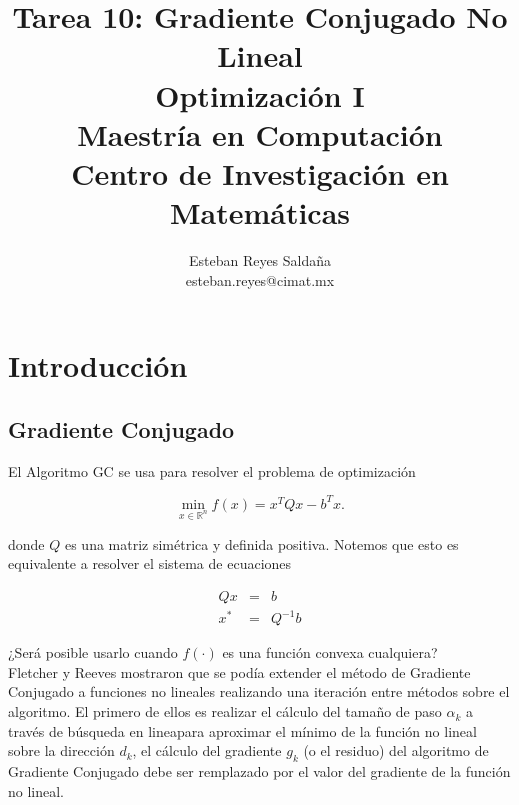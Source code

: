 \documentclass[11pt,letterpaper]{article}
\title{\textbf{Tarea 10: Gradiente Conjugado No Lineal}\\ Optimización I \\ \Large {Maestría en Computación}\\ \Large {Centro de Investigación en Matemáticas}}
\author{Esteban Reyes Saldaña \\ esteban.reyes@cimat.mx}
\theoremstyle{definition}
\theoremstyle{definition}
\theoremstyle{definition}
\begin{document}

\section{Introducción}
\subsection{Gradiente Conjugado}
El Algoritmo GC se usa para resolver el problema de
optimización
\begin{shaded*}
	\begin{equation}
		\min_{x\in\mathbb{R}^n} f(x) =  x^T Q x - b^T x.
	\end{equation}
\end{shaded*}
donde $ Q $ es una matriz simétrica y definida positiva. Notemos que esto es equivalente a resolver el sistema de ecuaciones
\begin{shaded*}
	\begin{eqnarray*}
		Qx & = &  b \\
		x^*& = & Q^{-1} b
	\end{eqnarray*}
\end{shaded*}
¿Será posible usarlo cuando $ f(\cdot) $ es una función convexa cualquiera?
\\
Fletcher y Reeves mostraron que se podía extender el
método de Gradiente Conjugado a funciones no lineales
realizando una iteración entre métodos sobre el algoritmo. El primero de
ellos es realizar el cálculo del tamaño de paso $ \alpha_k $ a través
de búsqueda en lineapara aproximar el mínimo de
 la función no lineal sobre la dirección $ d_k $, el cálculo del
gradiente $ g_k $ (o el residuo) del algoritmo de Gradiente
Conjugado debe ser remplazado por el valor del gradiente
de la función no lineal.
\end{document}
